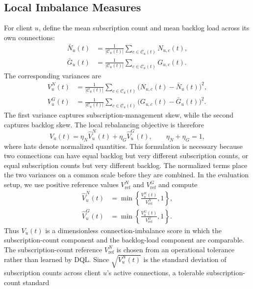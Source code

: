 \documentclass[manuscript]{acmart}
\begin{document}
\subsection{Local Imbalance Measures}

For client $u$, define the mean subscription count and mean backlog load across
its own connections:
\begin{align}
	\bar{N}_u(t)
	&= \frac{1}{|\mathcal{C}_u(t)|}
	\sum_{c\in\mathcal{C}_u(t)} N_{u,c}(t),\\
	\bar{G}_u(t)
	&= \frac{1}{|\mathcal{C}_u(t)|}
	\sum_{c\in\mathcal{C}_u(t)} G_{u,c}(t).
\end{align}
The corresponding variances are
\begin{align}
	V^N_u(t)
	&= \frac{1}{|\mathcal{C}_u(t)|}
	\sum_{c\in\mathcal{C}_u(t)}
	\bigl(N_{u,c}(t)-\bar{N}_u(t)\bigr)^2,\\
	V^G_u(t)
	&= \frac{1}{|\mathcal{C}_u(t)|}
	\sum_{c\in\mathcal{C}_u(t)}
	\bigl(G_{u,c}(t)-\bar{G}_u(t)\bigr)^2.
\end{align}
The first variance captures subscription-management skew, while the second
captures backlog skew. The local rebalancing objective is therefore
\begin{equation}
	V_u(t)=
	\eta_N\widehat{V}^N_u(t)
	+\eta_G\widehat{V}^G_u(t),
	\qquad
	\eta_N+\eta_G=1,
	\label{eq:local_connection_imbalance}
\end{equation}
where hats denote normalized quantities. This formulation is necessary because
two connections can have equal backlog but very different subscription counts,
or equal subscription counts but very different backlog.
The normalized terms place the two variances on a common scale before they are
combined. In the evaluation setup, we use positive reference values
$V^N_{\mathrm{ref}}$ and $V^G_{\mathrm{ref}}$ and compute
\begin{align*}
	\widehat{V}^N_u(t)
	&=\min\left\{\frac{V^N_u(t)}{V^N_{\mathrm{ref}}},1\right\},\\
	\widehat{V}^G_u(t)
	&=\min\left\{\frac{V^G_u(t)}{V^G_{\mathrm{ref}}},1\right\}.
\end{align*}
Thus $V_u(t)$ is a dimensionless connection-imbalance score in which the
subscription-count component and the backlog-load component are comparable.
The subscription-count reference $V^N_{\mathrm{ref}}$ is chosen from an
operational tolerance rather than learned by DQL. Since
$\sqrt{V^N_u(t)}$ is the standard deviation of subscription counts across
client $u$'s active connections, a tolerable subscription-count standard
\end{document}
